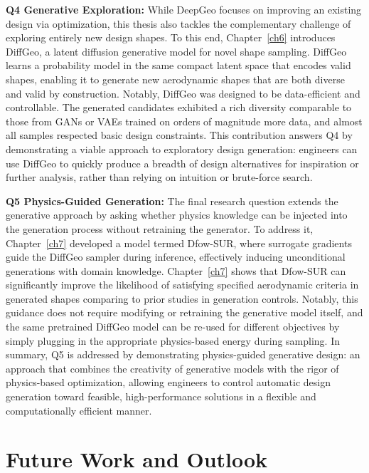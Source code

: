 \textbf{Q4 Generative Exploration:} While DeepGeo focuses on improving an existing design via optimization, this thesis also tackles the complementary challenge of exploring entirely new design shapes. To this end, Chapter~\ref{ch6} introduces DiffGeo, a latent diffusion generative model for novel shape sampling. DiffGeo learns a probability model in the same compact latent space that encodes valid shapes, enabling it to generate new aerodynamic shapes that are both diverse and valid by construction. Notably, DiffGeo was designed to be data-efficient and controllable. The generated candidates exhibited a rich diversity comparable to those from GANs or VAEs trained on orders of magnitude more data, and almost all samples respected basic design constraints. This contribution answers Q4 by demonstrating a viable approach to exploratory design generation: engineers can use DiffGeo to quickly produce a breadth of design alternatives for inspiration or further analysis, rather than relying on intuition or brute-force search.

\textbf{Q5 Physics-Guided Generation:} The final research question extends the generative approach by asking whether physics knowledge can be injected into the generation process without retraining the generator. To address it, Chapter~\ref{ch7} developed a model termed Dfow-SUR, where surrogate gradients guide the DiffGeo sampler during inference, effectively inducing unconditional generations with domain knowledge. Chapter~\ref{ch7} shows that Dfow-SUR can significantly improve the likelihood of satisfying specified aerodynamic criteria in generated shapes comparing to prior studies in generation controls. Notably, this guidance does not require modifying or retraining the generative model itself, and the same pretrained DiffGeo model can be re-used for different objectives by simply plugging in the appropriate physics-based energy during sampling. In summary, Q5 is addressed by demonstrating physics-guided generative design: an approach that combines the creativity of generative models with the rigor of physics-based optimization, allowing engineers to control automatic design generation toward feasible, high-performance solutions in a flexible and computationally efficient manner.

\section{Future Work and Outlook}

